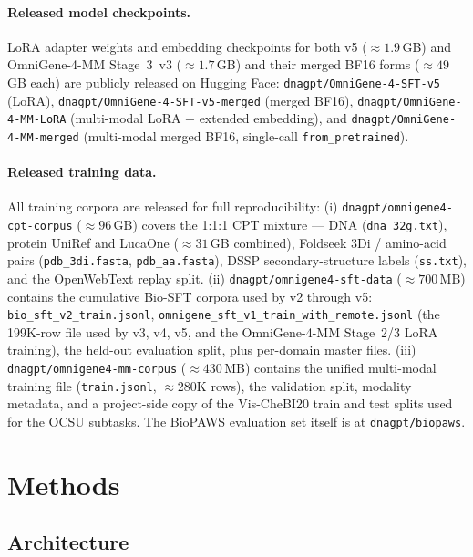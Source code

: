 \documentclass[11pt]{article}
\begin{document}
\paragraph{Released model checkpoints.} LoRA adapter weights and embedding checkpoints for both v5 ($\approx 1.9$\,GB) and OmniGene-4-MM Stage~3~v3 ($\approx 1.7$\,GB) and their merged BF16 forms ($\approx 49$\,GB each) are publicly released on Hugging Face: \texttt{dnagpt/OmniGene-4-SFT-v5} (LoRA), \texttt{dnagpt/OmniGene-4-SFT-v5-merged} (merged BF16), \texttt{dnagpt/OmniGene-4-MM-LoRA} (multi-modal LoRA + extended embedding), and \texttt{dnagpt/OmniGene-4-MM-merged} (multi-modal merged BF16, single-call \texttt{from\_pretrained}).

\paragraph{Released training data.} All training corpora are released for full reproducibility: (i) \texttt{dnagpt/omnigene4-cpt-corpus} ($\approx 96$\,GB) covers the 1{:}1{:}1 CPT mixture --- DNA (\texttt{dna\_32g.txt}), protein UniRef and LucaOne ($\approx 31$\,GB combined), Foldseek 3Di / amino-acid pairs (\texttt{pdb\_3di.fasta}, \texttt{pdb\_aa.fasta}), DSSP secondary-structure labels (\texttt{ss.txt}), and the OpenWebText replay split. (ii) \texttt{dnagpt/omnigene4-sft-data} ($\approx 700$\,MB) contains the cumulative Bio-SFT corpora used by v2 through v5: \texttt{bio\_sft\_v2\_train.jsonl}, \texttt{omnigene\_sft\_v1\_train\_with\_remote.jsonl} (the 199K-row file used by v3, v4, v5, and the OmniGene-4-MM Stage~2/3 LoRA training), the held-out evaluation split, plus per-domain master files. (iii) \texttt{dnagpt/omnigene4-mm-corpus} ($\approx 430$\,MB) contains the unified multi-modal training file (\texttt{train.jsonl}, $\approx 280$K rows), the validation split, modality metadata, and a project-side copy of the Vis-CheBI20 \citep{fan2025ocsu} train and test splits used for the OCSU subtasks. The BioPAWS evaluation set itself is at \texttt{dnagpt/biopaws}.

\section{Methods}
\label{sec:methods}

\subsection{Architecture}
\end{document}
